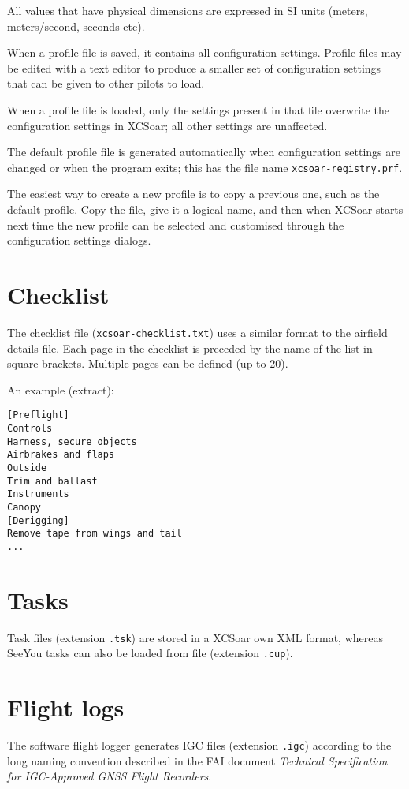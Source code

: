 All values that have physical dimensions are expressed in SI units
(meters, meters/second, seconds etc).

When a profile file is saved, it contains all configuration settings.
Profile files may be edited with a text editor to produce a smaller
set of configuration settings that can be given to other pilots to
load.  

When a profile file is loaded, only the settings present in that file
overwrite the configuration settings in XCSoar; all other settings are
unaffected.

The default profile file is generated automatically when configuration
settings are changed or when the program exits; this has the
file name \verb|xcsoar-registry.prf|.

The easiest way to create a new profile is to copy a previous one,
such as the default profile.  Copy the file, give it a logical name,
and then when XCSoar starts next time the new profile can be selected
and customised through the configuration settings dialogs.


\section{Checklist}

The checklist file (\verb|xcsoar-checklist.txt|) uses a similar format to
the airfield details file.  Each page in the checklist is preceded by
the name of the list in square brackets.  Multiple pages can be
defined (up to 20).

An example (extract):
\begin{verbatim}
[Preflight]
Controls
Harness, secure objects
Airbrakes and flaps
Outside
Trim and ballast
Instruments
Canopy
[Derigging]
Remove tape from wings and tail
...
\end{verbatim}

\section{Tasks}

Task files (extension \verb|.tsk|) are stored in a XCSoar own XML format, 
whereas SeeYou tasks can also be loaded from file (extension \verb|.cup|).

\section{Flight logs} \label{sec:logfiles}

The software flight logger generates IGC files (extension \verb|.igc|)
according to the long naming convention described in the FAI 
document {\em Technical Specification for IGC-Approved GNSS Flight Recorders}.  

